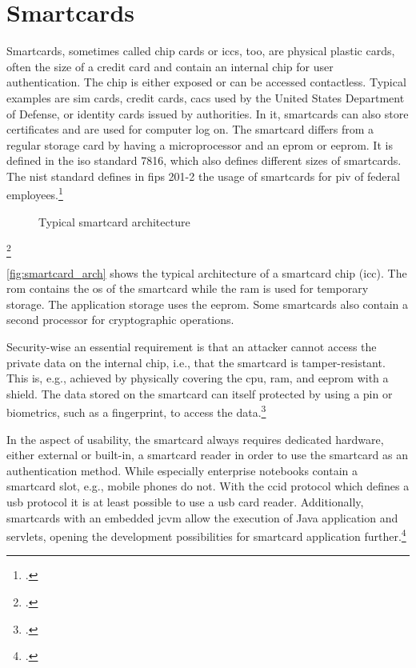 \section{Smartcards}

Smartcards, sometimes called chip cards or \glspl{icc}, too, are physical plastic cards, often the size of a credit card and contain an internal chip for user authentication. The chip is either exposed or can be accessed contactless. Typical examples are \gls{sim} cards, credit cards, \glspl{cac} used by the United States Department of Defense, or identity cards issued by authorities. In \gls{it}, smartcards can also store certificates and are used for computer log on. The smartcard differs from a regular storage card by having a microprocessor and an \gls{eprom} or \gls{eeprom}. It is defined in the \gls{iso} standard 7816, which also defines different sizes of smartcards. The \gls{nist} standard defines in \gls{fips} 201-2 the usage of smartcards for \gls{piv} of federal employees.\footcites[See][525--527]{eckert-it-sec-9}[See][]{iso7816}[See][6--9]{1698485}[See][]{FIPS201-2}


\begin{figure}[hbt]
	\centering
	
	\caption[Typical smartcard architecture]{Typical smartcard architecture\footnotemark}
	\label{fig:smartcard_arch}
\end{figure}
\footcitetexts[Source: diagram by author, based on][33]{electronic_certification_mobile_devices}[][228]{1698485}

\autoref{fig:smartcard_arch} shows the typical architecture of a smartcard chip (\gls{icc}). The \gls{rom} contains the \gls{os} of the smartcard while the \gls{ram} is used for temporary storage. The application storage uses the \gls{eeprom}. Some smartcards also contain a second processor for cryptographic operations.

Security-wise an essential requirement is that an attacker cannot access the private data on the internal chip, i.e., that the smartcard is tamper-resistant. This is, e.g., achieved by physically covering the \gls{cpu}, \gls{ram}, and \gls{eeprom} with a shield. The data stored on the smartcard can itself protected by using a \gls{pin} or biometrics, such as a fingerprint, to access the data.\footcites[See][34]{265831}[See][228]{1698485}

In the aspect of usability, the smartcard always requires dedicated hardware, either external or built-in, a smartcard reader in order to use the smartcard as an authentication method. While especially enterprise notebooks contain a smartcard slot, e.g., mobile phones do not. With the \gls{ccid} protocol which defines a \gls{usb} protocol it is at least possible to use a \gls{usb} card reader. Additionally, smartcards with an embedded \gls{jcvm} allow the execution of Java application and servlets, opening the development possibilities for smartcard application further.\footcites[See][65]{1698485}[See][539]{eckert-it-sec-9}